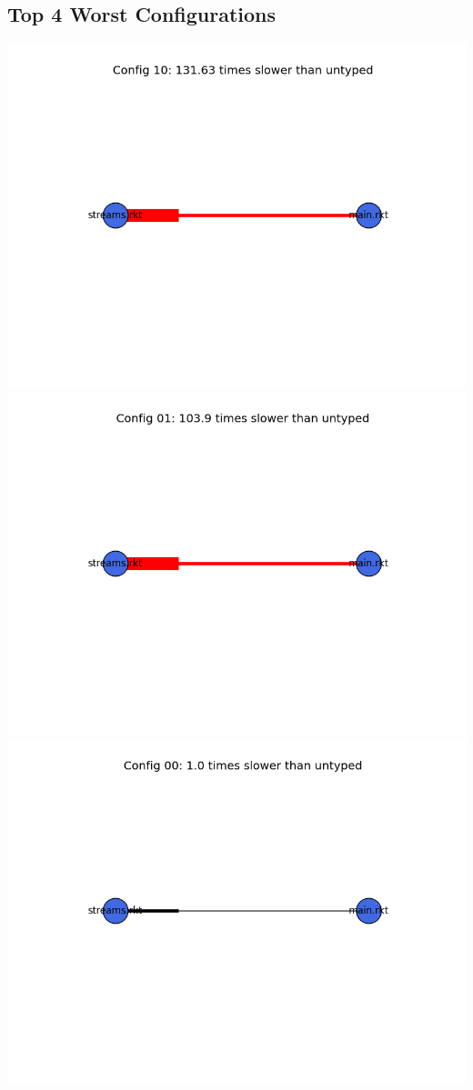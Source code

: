 \documentclass{article}
\begin{document}
\begin{itemize}
\subsection{Top 4 Worst Configurations}
\includegraphics[width=\textwidth]{sieve-2015-04-06-module-graph-10.png}
\includegraphics[width=\textwidth]{sieve-2015-04-06-module-graph-01.png}
\includegraphics[width=\textwidth]{sieve-2015-04-06-module-graph-00.png}

\end{itemize}
\end{document}
